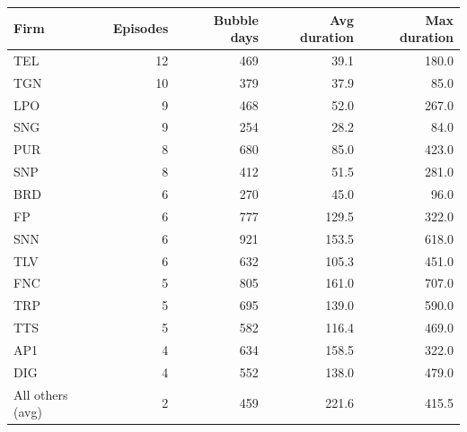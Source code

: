 \begin{tabular}{p{} r r r r}
\toprule
Firm & Episodes & Bubble days & Avg duration & Max duration \\
\midrule
TEL & 12 & 469 & 39.1 & 180.0 \\
TGN & 10 & 379 & 37.9 & 85.0 \\
LPO & 9 & 468 & 52.0 & 267.0 \\
SNG & 9 & 254 & 28.2 & 84.0 \\
PUR & 8 & 680 & 85.0 & 423.0 \\
SNP & 8 & 412 & 51.5 & 281.0 \\
BRD & 6 & 270 & 45.0 & 96.0 \\
FP & 6 & 777 & 129.5 & 322.0 \\
SNN & 6 & 921 & 153.5 & 618.0 \\
TLV & 6 & 632 & 105.3 & 451.0 \\
FNC & 5 & 805 & 161.0 & 707.0 \\
TRP & 5 & 695 & 139.0 & 590.0 \\
TTS & 5 & 582 & 116.4 & 469.0 \\
AP1 & 4 & 634 & 158.5 & 322.0 \\
DIG & 4 & 552 & 138.0 & 479.0 \\
All others (avg) & 2 & 459 & 221.6 & 415.5 \\
\bottomrule
\end{tabular}
